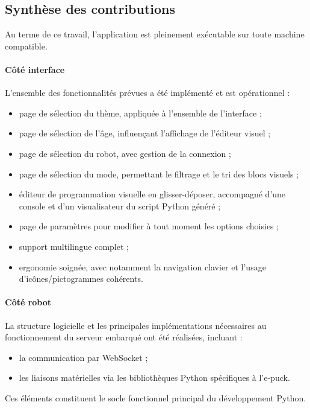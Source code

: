 \subsection{Synthèse des contributions} \label{sec:synthese_contribs}

Au terme de ce travail, l'application est pleinement exécutable sur toute machine compatible.

\paragraph{Côté interface}  
L’ensemble des fonctionnalités prévues a été implémenté et est opérationnel :
\begin{itemize}
    \item page de sélection du thème, appliquée à l’ensemble de l’interface ;
    \item page de sélection de l’âge, influençant l’affichage de l’éditeur visuel ;
    \item page de sélection du robot, avec gestion de la connexion ;
    \item page de sélection du mode, permettant le filtrage et le tri des blocs visuels ;
    \item éditeur de programmation visuelle en glisser-déposer, accompagné d’une console et d’un visualisateur du script Python généré ;
    \item page de paramètres pour modifier à tout moment les options choisies ;
    \item support multilingue complet ;
    \item ergonomie soignée, avec notamment la navigation clavier et l’usage d’icônes/pictogrammes cohérents.
\end{itemize}

\paragraph{Côté robot}  
La structure logicielle et les principales implémentations nécessaires au fonctionnement du serveur embarqué ont été réalisées, incluant :
\begin{itemize}
    \item la communication par WebSocket ;
    \item les liaisons matérielles via les bibliothèques Python spécifiques à l’e-puck.
\end{itemize}
Ces éléments constituent le socle fonctionnel principal du développement Python.
